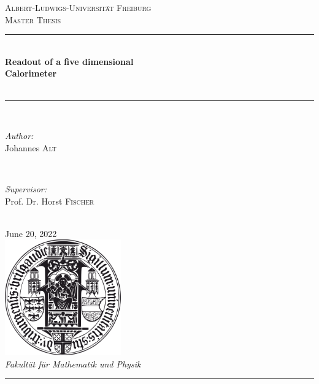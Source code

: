 \begin{titlepage}
\newcommand{\HRule}{\rule{\linewidth}{0.25mm}} %
\center
\textsc{\LARGE Albert-Ludwigs-Universit\"{a}t Freiburg}\\[1.5cm]
\textsc{\Large Master Thesis}\\[0.4cm]
\HRule \\[0.4cm]
{\huge \bfseries Readout of a five dimensional} \\[0.2cm] 
{\huge \bfseries Calorimeter} \\[0.2cm]
\\[0.2cm]
\HRule \\[1.5cm]

\begin{minipage}{0.4\textwidth}
\begin{flushleft} \large
\emph{Author:}\\
Johannes \textsc{Alt} \\
\end{flushleft}
\end{minipage}
~
\begin{minipage}{0.4\textwidth}
\begin{flushright} \large
\emph{Supervisor:} \\
Prof. Dr. Horst \textsc{Fischer} \\
\end{flushright}
\end{minipage}\\[2cm]

{\large June 20, 2022}\\[1cm]

\includegraphics[width=5cm, keepaspectratio]{pictures/siegel.png}\\[1cm]

\large \emph{Fakult\"{a}t f\"{u}r Mathematik und Physik}\\[0.4cm]

\HRule \\
\setcounter{page}{0}
\end{titlepage}
